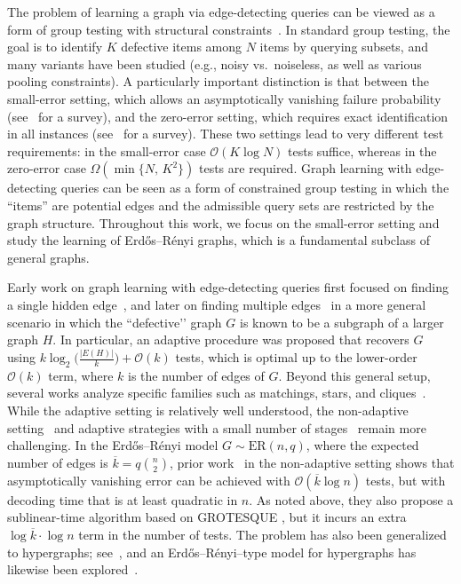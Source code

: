 \documentclass[journal]{IEEEtran}
\theoremstyle{definition}
\theoremstyle{definition}
\newcommand{\ER}{\mathrm{ER}}
\newcommand{\kb}{\overline{k}}
\newcommand{\bigO}{\mathcal{O}}
\begin{document}
The problem of learning a graph via edge-detecting queries can be viewed as a form of group testing with structural constraints~\cite[Section~5.8]{aldridge2019group}. In standard group testing, the goal is to identify \(K\) defective items among \(N\) items by querying subsets, and many variants have been studied (e.g., noisy vs.\ noiseless, as well as various pooling constraints). A particularly important distinction is that between the small-error setting, which allows an asymptotically vanishing failure probability (see~\cite{aldridge2019group} for a survey), and the zero-error setting, which requires exact identification in all instances (see~\cite{du1999combinatorial} for a survey). These two settings lead to very different test requirements: in the small-error case \(\bigO(K\log N)\) tests suffice, whereas in the zero-error case \(\Omega(\min\{N,\,K^2\})\) tests are  required. Graph learning with edge-detecting queries can be seen as a form of constrained group testing in which the ``items'' are potential edges and the admissible query sets are restricted by the graph structure. Throughout this work, we focus on the small-error setting and study the learning of Erd\H{o}s–R\'enyi graphs, which is a fundamental subclass of general graphs.



Early work on graph learning with edge-detecting queries first focused on finding a single hidden edge~\cite{aigner1986search,aigner1988searching}, and later on finding multiple edges~\cite{johann2002group} in a more general scenario in which the “defective’’ graph \(G\) is known to be a subgraph of a larger graph \(H\). In particular, an adaptive procedure was proposed that recovers \(G\) using \(k \log_2 \big(\tfrac{|E(H)|}{k}\big) + \bigO(k)\) tests, which is optimal up to the lower-order \(\bigO(k)\) term, where \(k\) is the number of edges of \(G\). Beyond this general setup, several works analyze specific families such as matchings, stars, and cliques~\cite{grebinski1998reconstructing,alon2004learning,alon2005learning}. While the adaptive setting is relatively well understood, the non\mbox{-}adaptive setting~\cite{abasi2019learning,kameli2018non} and adaptive strategies with a small number of stages~\cite{du2006pooling,bshouty2015linear,abasi2019learning} remain more challenging. In the Erd\H{o}s–R\'enyi model \(G\sim\ER(n,q)\), where the expected number of edges is \(\kb=q\binom{n}{2}\), prior work~\cite{li2019learning} in the non\mbox{-}adaptive setting shows that asymptotically vanishing error can be achieved with \(\bigO(\kb\log n)\) tests, but with decoding time that is at least quadratic in \(n\).  As noted above, they also propose a sublinear-time algorithm based on GROTESQUE \cite{cai2017efficient}, but it incurs an extra $\log \kb \cdot \log n$ term in the number of tests.  The problem has also been generalized to hypergraphs; see~\cite{angluin2006learning,angluin2008learning,d2016multistage,abasi2018non}, and an Erd\H{o}s–R\'enyi–type model for hypergraphs has likewise been explored~\cite{austhof2025non}.
\end{document}
